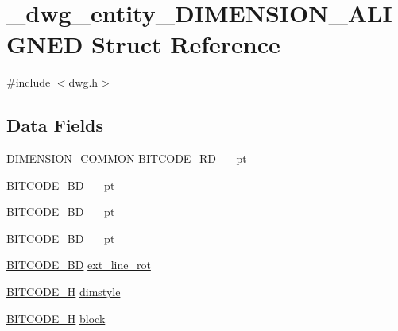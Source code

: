 \hypertarget{struct__dwg__entity__DIMENSION__ALIGNED}{\section{\-\_\-dwg\-\_\-entity\-\_\-\-D\-I\-M\-E\-N\-S\-I\-O\-N\-\_\-\-A\-L\-I\-G\-N\-E\-D \-Struct \-Reference}
\label{struct__dwg__entity__DIMENSION__ALIGNED}
}


{\ttfamily \#include $<$dwg.\-h$>$}

\subsection*{\-Data \-Fields}
\begin{DoxyCompactItemize}
\item 
\hyperlink{dwg_8h_a334d626d7e4a0a1af39036446dfa82c4}{\-D\-I\-M\-E\-N\-S\-I\-O\-N\-\_\-\-C\-O\-M\-M\-O\-N} \hyperlink{dwg_8h_a1d23a9bc9a02453876b244dc6706f6a6}{\-B\-I\-T\-C\-O\-D\-E\-\_\-R\-D} \hyperlink{struct__dwg__entity__DIMENSION__ALIGNED_a9b294ba5e83955b81641fb5c84ec3ac4}{\-\_\-\_\-pt}
\item 
\hyperlink{dwg_8h_a00698ef1bb072aa0a9360c6fc1c57587}{\-B\-I\-T\-C\-O\-D\-E\-\_\-B\-D} \hyperlink{struct__dwg__entity__DIMENSION__ALIGNED_acc34c679ce1846ae09f03aacfe7f0d9e}{\-\_\-\_\-pt}
\item 
\hyperlink{dwg_8h_a00698ef1bb072aa0a9360c6fc1c57587}{\-B\-I\-T\-C\-O\-D\-E\-\_\-B\-D} \hyperlink{struct__dwg__entity__DIMENSION__ALIGNED_ab58a0b04df3c807e382afaff018b1730}{\-\_\-\_\-pt}
\item 
\hyperlink{dwg_8h_a00698ef1bb072aa0a9360c6fc1c57587}{\-B\-I\-T\-C\-O\-D\-E\-\_\-B\-D} \hyperlink{struct__dwg__entity__DIMENSION__ALIGNED_a5dcd0bf63f7cc45cc419088b7920a308}{\-\_\-\_\-pt}
\item 
\hyperlink{dwg_8h_a3c1e6781466b74ba07785d57da70ed97}{\-B\-I\-T\-C\-O\-D\-E\-\_\-\-B\-D} \hyperlink{struct__dwg__entity__DIMENSION__ALIGNED_a7d51fe4008d42821b8058f789726a08f}{ext\-\_\-line\-\_\-rot}
\item 
\hyperlink{dwg_8h_a7c700e94e047a97ba8c24bdfe4029dc3}{\-B\-I\-T\-C\-O\-D\-E\-\_\-\-H} \hyperlink{struct__dwg__entity__DIMENSION__ALIGNED_a71695d7f1ee0927fbfae8555d9470cdf}{dimstyle}
\item 
\hyperlink{dwg_8h_a7c700e94e047a97ba8c24bdfe4029dc3}{\-B\-I\-T\-C\-O\-D\-E\-\_\-\-H} \hyperlink{struct__dwg__entity__DIMENSION__ALIGNED_a2e283ca26286e0a39f9f9a18debaf9c4}{block}
\end{DoxyCompactItemize}


